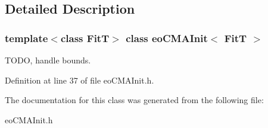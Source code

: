 \subsection{Detailed Description}
\subsubsection*{template$<$class Fit\-T$>$ class eo\-CMAInit$<$ Fit\-T $>$}

TODO, handle bounds. 



Definition at line 37 of file eo\-CMAInit.h.

The documentation for this class was generated from the following file:\begin{CompactItemize}
\item 
eo\-CMAInit.h\end{CompactItemize}
